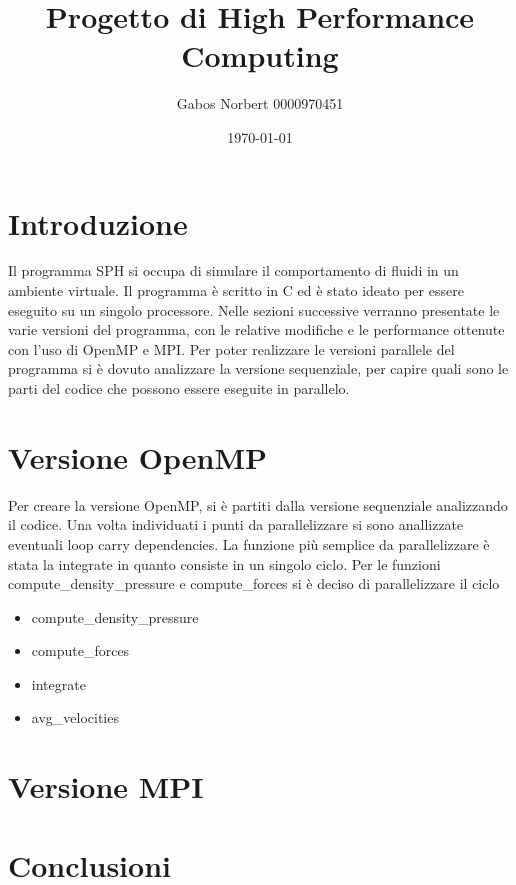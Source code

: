 \documentclass[a4paper,12pt, oneside]{article}
\title{Progetto di High Performance Computing}
\author{Gabos Norbert 0000970451}
\date{\today}
\begin{document}
\maketitle

\section{Introduzione}

Il programma SPH si occupa di simulare il comportamento di fluidi in un ambiente virtuale.
Il programma è scritto in C ed è stato ideato per essere eseguito su un singolo processore.
Nelle sezioni successive verranno presentate le varie versioni del programma, con le relative
modifiche e le performance ottenute con l'uso di OpenMP e MPI.
Per poter realizzare le versioni parallele del programma si è dovuto analizzare la versione
sequenziale, per capire quali sono le parti del codice che possono essere eseguite in parallelo.

\section{Versione OpenMP}

Per creare la versione OpenMP, si è partiti dalla versione sequenziale analizzando il codice.
Una volta individuati i punti da parallelizzare si sono anallizzate eventuali loop carry dependencies.
La funzione più semplice da parallelizzare è stata la integrate in quanto consiste in un singolo ciclo.
Per le funzioni compute_density_pressure e compute_forces si è deciso di parallelizzare il ciclo
\begin{itemize}
\item compute_density_pressure 
\item compute_forces
\item integrate
\item avg_velocities
\end{itemize}


\section{Versione MPI}
\section{Conclusioni}
\end{document}
